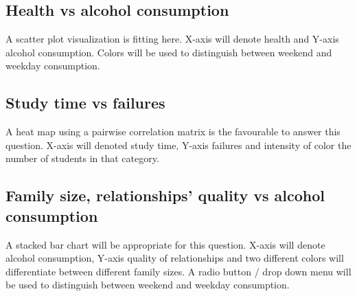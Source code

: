 \documentclass[titlepage, 12pt]{article}
\begin{document}
\subsection{Health vs alcohol consumption}
A scatter plot visualization is fitting here. X-axis will denote health and
Y-axis alcohol consumption. Colors will be used to distinguish between weekend
and weekday consumption.

\subsection{Study time vs failures}
A heat map using a pairwise correlation matrix is the favourable to answer this
question. X-axis will denoted study time, Y-axis failures and intensity of color
the number of students in that category.

\subsection{Family size, relationships' quality vs alcohol consumption}
A stacked bar chart will be appropriate for this question. X-axis will denote
alcohol consumption, Y-axis quality of relationships and two different colors
will differentiate between different family sizes. A radio button / drop down
menu will be used to distinguish between weekend and weekday consumption.
\end{document}
